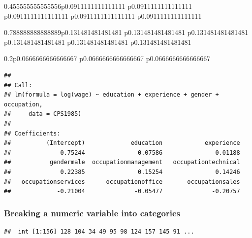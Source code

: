 \documentclass[]{book}
\newenvironment{Shaded}{\begin{snugshade}}{\end{snugshade}}
\newcommand{\CommentTok}[1]{\textcolor[rgb]{0.56,0.35,0.01}{\textit{#1}}}
\newcommand{\DecValTok}[1]{\textcolor[rgb]{0.00,0.00,0.81}{#1}}
\newcommand{\KeywordTok}[1]{\textcolor[rgb]{0.13,0.29,0.53}{\textbf{#1}}}
\newcommand{\NormalTok}[1]{#1}
\newcommand{\OperatorTok}[1]{\textcolor[rgb]{0.81,0.36,0.00}{\textbf{#1}}}
\newcommand{\StringTok}[1]{\textcolor[rgb]{0.31,0.60,0.02}{#1}}
\begin{document}
\begin{tabularx}{0.455555555555556\textwidth}{p{} p{} p{} p{} p{}}
\begin{tabularx}{0.788888888888889\textwidth}{p{} p{} p{} p{} p{} p{}}
\begin{tabularx}{0.2\textwidth}{p{} p{} p{}}
\begin{verbatim}
## 
## Call:
## lm(formula = log(wage) ~ education + experience + gender + occupation, 
##     data = CPS1985)
## 
## Coefficients:
##          (Intercept)             education            experience  
##              0.75244               0.07586               0.01188  
##           gendermale  occupationmanagement   occupationtechnical  
##              0.22385               0.15254               0.14246  
##   occupationservices      occupationoffice       occupationsales  
##             -0.21004              -0.05477              -0.20757
\end{verbatim}

\hypertarget{breaking-a-numeric-variable-into-categories}{%
\subsubsection{Breaking a numeric variable into
categories}\label{breaking-a-numeric-variable-into-categories}}

\begin{Shaded}
\end{Shaded}

\begin{verbatim}
##  int [1:156] 128 104 34 49 95 98 124 157 145 91 ...
\end{verbatim}

\begin{Shaded}
\end{Shaded}


\end{tabularx}
\end{tabularx}
\end{tabularx}
\end{document}
